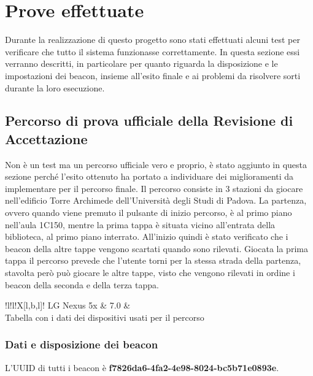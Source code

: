 \section{Prove effettuate}
\label{prove}
Durante la realizzazione di questo progetto sono stati effettuati alcuni test per verificare che tutto il sistema funzionasse correttamente. In questa sezione essi verranno descritti, in particolare per quanto riguarda la disposizione e le impostazioni dei beacon, insieme all'esito finale e ai problemi da risolvere sorti durante la loro esecuzione.
	\subsection{Percorso di prova ufficiale della Revisione di Accettazione}
		Non è un test ma un percorso ufficiale vero e proprio, è stato aggiunto in questa sezione perché l'esito ottenuto ha portato a individuare dei miglioramenti da implementare per il percorso finale.
		Il percorso consiste in 3 stazioni da giocare nell'edificio Torre Archimede dell'Università degli Studi di Padova. La partenza, ovvero quando viene premuto il pulsante di inizio percorso, è al primo piano nell'aula 1C150, mentre la prima tappa è situata vicino all'entrata della biblioteca, al primo piano interrato. All'inizio quindi è stato verificato che i beacon della altre tappe vengono scartati quando sono rilevati. Giocata la prima tappa il percorso prevede che l'utente torni per la stessa strada della partenza, stavolta però può giocare le altre tappe, visto che vengono rilevati in ordine i beacon della seconda e della terza tappa.

		\begin{tabella}{!{\VRule}l!{\VRule}l!{\VRule}X[l,b,l]!{\VRule}} %
			LG Nexus 5x & 7.0 & \\
			\caption{Tabella con i dati dei dispositivi usati per il percorso}
		\end{tabella}

		\subsubsection{Dati e disposizione dei beacon}
		L'UUID di tutti i beacon è \textbf{f7826da6-4fa2-4e98-8024-bc5b71e0893e}.

